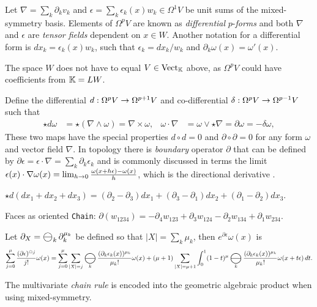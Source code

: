 \documentclass[]{article}
\DeclareMathOperator*{\bigominus}{\scalerel*{\ominus}{\bigodot}}
\begin{document}
\begin{definition}
	Let $\nabla = \sum_k\partial_kv_k$ and $\epsilon = \sum_k\epsilon_k(x)w_k \in \Omega^1V$ be unit sums of the mixed-symmetry basis.
	Elements of $\Omega^pV$ are known as \textit{differential} $p$-\textit{forms} and both $\nabla$ and $\epsilon$ are \textit{tensor fields} dependent on $x\in W$.
	Another notation for a differential form is $dx_k = \epsilon_k(x)w_k$, such that $\epsilon_k = dx_k/w_k$ and $\partial_k\omega(x) = \omega'(x)$.
\end{definition}
\begin{note}
	The space $W$ does not have to equal $V\in\text{Vect}_{\mathbb{K}}$ above, as $\Omega^pV$ could have coefficients from $\mathbb{K} = LW$.
\end{note}
\begin{definition}
	Define \cite{bishop-goldberg} the differential $d:\Omega^p V\rightarrow\Omega^{p+1}V$ and co-differential $\delta:\Omega^pV\rightarrow\Omega^{p-1}V$ such that
	\begin{align*}
		\star d\omega &= \star(\nabla\wedge\omega) = \nabla\times\omega, & \omega\cdot\nabla &= \omega\vee\star\nabla = \partial\omega =-\delta\omega, 
	\end{align*}
	These two maps have the special properties $d\circ d=0$ and $\partial\circ\partial = 0$ for any form $\omega$ and vector field $\nabla$. 
	In topology there is \textit{boundary} operator $\partial$ that can be defined by $\partial\epsilon = \epsilon\cdot\nabla = \sum_k\partial_k\epsilon_k$ and is commonly discussed in terms the limit $\epsilon(x)\cdot\nabla\omega(x) = \lim_{h\rightarrow0} \frac{\omega(x+h\epsilon)-\omega(x)}{h}$, which is the directional derivative \cite{sobczyk}.
\end{definition}
\begin{example}
	$\star d(dx_1+dx_2+dx_3) = (∂_2 -∂_3)dx_1 + (∂_3 -∂_1)dx_2 + (∂_1 -∂_2)dx_3$.
\end{example}
\begin{example}
	Faces as oriented \verb`Chain`: $\partial(w_{1234}) = -\partial_4w_{123}+\partial_3w_{124}-\partial_2w_{134}+\partial_1w_{234}$.
\end{example}
\begin{theorem}
	Let $\partial_X=\bigominus_k\partial_k^{\mu_k}$ be defined so that $|X|=\sum_k\mu_k$, then $e^{\partial\epsilon}\omega(x)$ is
	\begin{align*}
		\sum_{j=0}^\mu \frac{(\partial\epsilon)^{\ominus j}}{j!}\omega(x)
		= \sum_{j=0}^\mu\sum_{|X|=j} \bigominus_k \frac{(\partial_{k}\epsilon_k(x))^{\mu_{k}}}{\mu_k!}\omega(x)
		+ (\mu+1)\sum_{|X|=\mu+1}\int_0^1(1-t)^\mu\bigominus_k\frac{(\partial_k\epsilon_k(x))^{\mu_k}}{\mu_k!}\omega(x+t\epsilon)\,dt.
	\end{align*}
\end{theorem}
The multivariate \textit{chain rule} is encoded into the geometric algebraic product when using mixed-symmetry.
\end{document}
